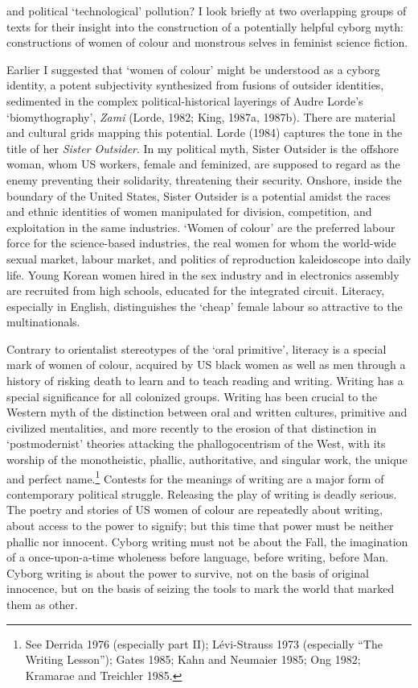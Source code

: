 \documentclass[DIV=12,%
               BCOR=10mm,%
               headinclude=false,%
               footinclude=false,open=any,%
               fontsize=11pt,%
               twoside,%
               paper=210mm:11in]%
               {scrbook}
\begin{document}
and political ‘technological’ pollution? I look briefly at two overlapping groups of texts for their insight into the construction of a potentially helpful cyborg myth: constructions of women of colour and monstrous selves in feminist science fiction.


Earlier I suggested that ‘women of colour’ might be understood as a cyborg identity, a potent subjectivity synthesized from fusions of outsider identities, sedimented in the complex political-historical layerings of Audre Lorde’s ‘biomythography’, \emph{Zami} (Lorde, 1982; King, 1987a, 1987b). There are material and cultural grids mapping this potential. Lorde (1984) captures the tone in the title of her \emph{Sister Outsider}. In my political myth, Sister Outsider is the offshore woman, whom US workers, female and feminized, are supposed to regard as the enemy preventing their solidarity, threatening their security. Onshore, inside the boundary of the United States, Sister Outsider is a potential amidst the races and ethnic identities of women manipulated for division, competition, and exploitation in the same industries. ‘Women of colour’ are the preferred labour force for the science-based industries, the real women for whom the world-wide sexual market, labour market, and politics of reproduction kaleidoscope into daily life. Young Korean women hired in the sex industry and in electronics assembly are recruited from high schools, educated for the integrated circuit. Literacy, especially in English, distinguishes the ‘cheap’ female labour so attractive to the multinationals.


Contrary to orientalist stereotypes of the ‘oral primitive’, literacy is a special mark of women of colour, acquired by US black women as well as men through a history of risking death to learn and to teach reading and writing. Writing has a special significance for all colonized groups. Writing has been crucial to the Western myth of the distinction between oral and written cultures, primitive and civilized mentalities, and more recently to the erosion of that distinction in ‘postmodernist’ theories attacking the phallogocentrism of the West, with its worship of the monotheistic, phallic, authoritative, and singular work, the unique and perfect name.\footnote{See Derrida 1976 (especially part II); Lévi-Strauss 1973 (especially “The Writing Lesson”); Gates 1985; Kahn and Neumaier 1985; Ong 1982; Kramarae and Treichler 1985.} Contests for the meanings of writing are a major form of contemporary political struggle. Releasing the play of writing is deadly serious. The poetry and stories of US women of colour are repeatedly about writing, about access to the power to signify; but this time that power must be neither phallic nor innocent. Cyborg writing must not be about the Fall, the imagination of a once-upon-a-time wholeness before language, before writing, before Man. Cyborg writing is about the power to survive, not on the basis of original innocence, but on the basis of seizing the tools to mark the world that marked them as other.
\end{document}
